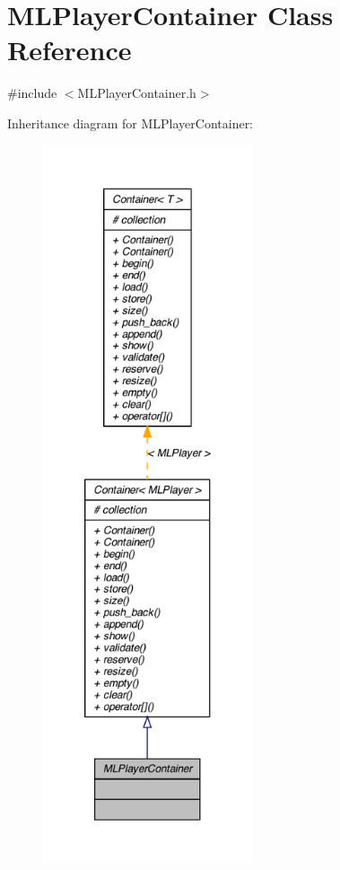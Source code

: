 \hypertarget{class_m_l_player_container}{
\section{MLPlayerContainer Class Reference}
\label{class_m_l_player_container}
}


{\ttfamily \#include $<$MLPlayerContainer.h$>$}



Inheritance diagram for MLPlayerContainer:\nopagebreak
\begin{figure}[H]
\begin{center}
\leavevmode
\includegraphics[height=600pt]{class_m_l_player_container__inherit__graph}
\end{center}
\end{figure}


